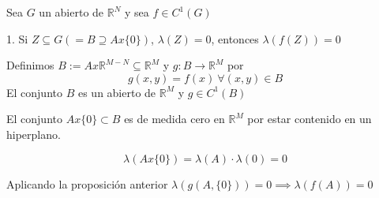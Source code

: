 
Sea $G$ un abierto de $\mathbb{R}^N$ y sea $f \in C^1(G)$

1. Si $Z \subseteq G(=B \supseteq Ax\{0\})$, $\lambda (Z) = 0$, entonces $\lambda (f(Z)) = 0$

Definimos $B := A x \mathbb{R}^{M-N} \subseteq \mathbb{R}^M$ y $g: B \rightarrow \mathbb{R}^M$ por
\[ g(x,y) = f(x) \ \forall (x,y)\in B\]
El conjunto $B$ es un abierto de $\mathbb{R}^M$ y $g\in C^1(B)$

El conjunto $Ax\{0\} \subset B$ es de medida cero en $\mathbb{R}^M$ por estar contenido en un hiperplano.

\[\lambda(Ax\{0\}) = \lambda (A) \cdot \lambda (0) = 0\]

Aplicando la proposición anterior $\lambda( g(A,\{0\}) ) = 0 \implies \lambda (f(A)) = 0$